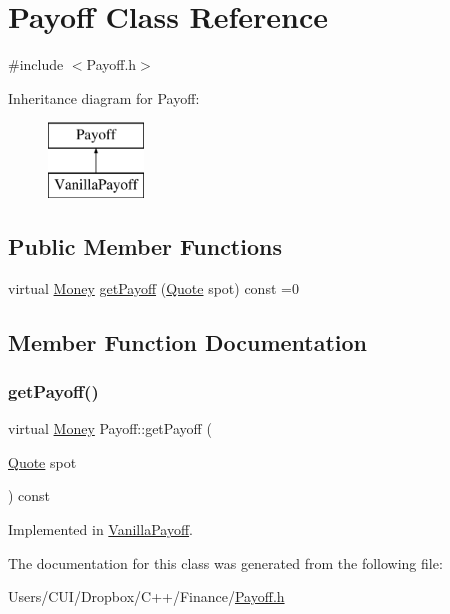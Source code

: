 \hypertarget{class_payoff}{}\section{Payoff Class Reference}
\label{class_payoff}


{\ttfamily \#include $<$Payoff.\+h$>$}

Inheritance diagram for Payoff\+:\begin{figure}[H]
\begin{center}
\leavevmode
\includegraphics[height=2.000000cm]{class_payoff}
\end{center}
\end{figure}
\subsection*{Public Member Functions}
\begin{DoxyCompactItemize}
\item 
virtual \hyperlink{_name_def_8h_a5a9d48c16a694e9a2d9f1eca730dc8c5}{Money} \hyperlink{class_payoff_a908e732330294a111345b4183ddb025b}{get\+Payoff} (\hyperlink{_name_def_8h_a642a6c5fd87319d922637de0e0bb0305}{Quote} spot) const =0
\end{DoxyCompactItemize}


\subsection{Member Function Documentation}
\hypertarget{class_payoff_a908e732330294a111345b4183ddb025b}{}\label{class_payoff_a908e732330294a111345b4183ddb025b} 
\subsubsection{\texorpdfstring{get\+Payoff()}{getPayoff()}}
{\footnotesize\ttfamily virtual \hyperlink{_name_def_8h_a5a9d48c16a694e9a2d9f1eca730dc8c5}{Money} Payoff\+::get\+Payoff (\begin{DoxyParamCaption}\item[{\hyperlink{_name_def_8h_a642a6c5fd87319d922637de0e0bb0305}{Quote}}]{spot }\end{DoxyParamCaption}) const\hspace{0.3cm}{\ttfamily [pure virtual]}}



Implemented in \hyperlink{class_vanilla_payoff_aa141f5b29c30d54448c93a21bef83bb3}{Vanilla\+Payoff}.



The documentation for this class was generated from the following file\+:\begin{DoxyCompactItemize}
\item 
Users/\+C\+U\+I/\+Dropbox/\+C++/\+Finance/\hyperlink{_payoff_8h}{Payoff.\+h}\end{DoxyCompactItemize}

